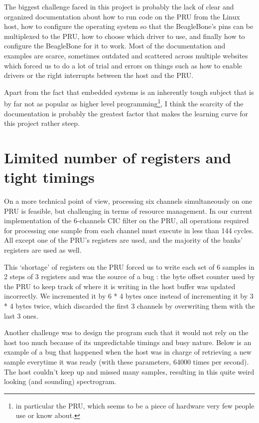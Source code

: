 \documentclass[]{report}
\begin{document}
The biggest challenge faced in this project is probably the lack of clear and organized documentation about how to run code on the PRU from the Linux host, how to configure the operating system so that the BeagleBone's pins can be multiplexed to the PRU, how to choose which driver to use, and finally how to configure the BeagleBone for it to work. Most of the documentation and examples are scarce, sometimes outdated and scattered across multiple websites which forced us to do a lot of trial and errors on things such as how to enable drivers or the right interrupts between the host and the PRU.

Apart from the fact that embedded systems is an inherently tough subject that is by far not as popular as higher level programming\footnote{in particular the PRU, which seems to be a piece of hardware very few people use or know about.}, I think the scarcity of the documentation is probably the greatest factor that makes the learning curve for this project rather steep.

\hypertarget{limited-number-of-registers-and-tight-timings}{%
\section{Limited number of registers and tight
timings}\label{limited-number-of-registers-and-tight-timings}}

On a more technical point of view, processing six channels simultaneously on one PRU is feasible, but challenging in terms of resource management. In our current implementation of the 6-channels CIC filter on the PRU, all operations required for processing one sample from each channel must execute in less than 144 cycles. All except one of the PRU's registers are used, and the majority of the banks' registers are used as well.

This `shortage' of registers on the PRU forced us to write each set of 6 samples in 2 steps of 3 registers and was the source of a bug : the byte offset counter used by the PRU to keep track of where it is writing in the host buffer was updated incorrectly. We incremented it by 6 * 4 bytes once instead of incrementing it by 3 * 4 bytes twice, which discarded the first 3 channels by overwriting them with the last 3 ones.

Another challenge was to design the program such that it would not rely on the host too much because of its unpredictable timings and busy nature. Below is an example of a bug that happened when the host was in charge of retrieving a new sample everytime it was ready (with these parameters, 64000 times per second). The host couldn't keep up and missed many samples, resulting in this quite weird looking (and sounding) spectrogram.
\end{document}
